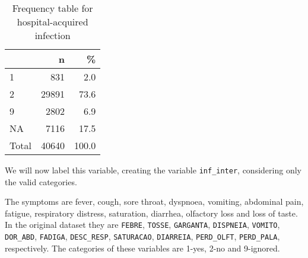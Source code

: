 \documentclass[
]{article}
\newenvironment{Shaded}{\begin{snugshade}}{\end{snugshade}}
\newcommand{\DataTypeTok}[1]{\textcolor[rgb]{0.13,0.29,0.53}{#1}}
\newcommand{\DecValTok}[1]{\textcolor[rgb]{0.00,0.00,0.81}{#1}}
\newcommand{\KeywordTok}[1]{\textcolor[rgb]{0.13,0.29,0.53}{\textbf{#1}}}
\newcommand{\NormalTok}[1]{#1}
\newcommand{\OperatorTok}[1]{\textcolor[rgb]{0.81,0.36,0.00}{\textbf{#1}}}
\newcommand{\OtherTok}[1]{\textcolor[rgb]{0.56,0.35,0.01}{#1}}
\newcommand{\StringTok}[1]{\textcolor[rgb]{0.31,0.60,0.02}{#1}}
\begin{document}
\begin{table}[!h]

\caption{\label{tab:unnamed-chunk-47}Frequency table for hospital-acquired infection}
\centering
\begin{tabular}[t]{l|r|r}
\hline
  & n & \%\\
\hline
1 & 831 & 2.0\\
\hline
2 & 29891 & 73.6\\
\hline
9 & 2802 & 6.9\\
\hline
NA & 7116 & 17.5\\
\hline
Total & 40640 & 100.0\\
\hline
\end{tabular}
\end{table}

We will now label this variable, creating the variable
\texttt{inf\_inter}, considering only the valid categories.

\begin{Shaded}
\end{Shaded}

The symptoms are fever, cough, sore throat, dyspnoea, vomiting,
abdominal pain, fatigue, respiratory distress, saturation, diarrhea,
olfactory loss and loss of taste. In the original dataset they are
\texttt{FEBRE}, \texttt{TOSSE}, \texttt{GARGANTA}, \texttt{DISPNEIA},
\texttt{VOMITO}, \texttt{DOR\_ABD}, \texttt{FADIGA},
\texttt{DESC\_RESP}, \texttt{SATURACAO}, \texttt{DIARREIA},
\texttt{PERD\_OLFT}, \texttt{PERD\_PALA}, respectively. The categories
of these variables are 1-yes, 2-no and 9-ignored.

\begin{Shaded}
\end{Shaded}
\end{document}

